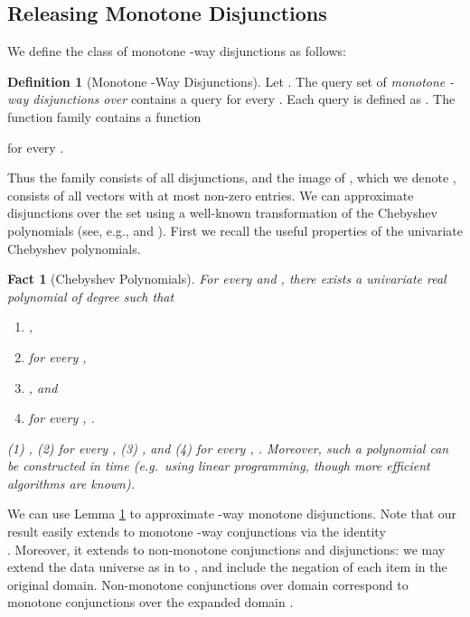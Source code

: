 \documentclass[11pt]{article}
\newtheorem{fact}[theorem]{Fact}
\theoremstyle{definition}
\newtheorem{definition}[theorem]{Definition}
\begin{document}
\subsection{Releasing Monotone Disjunctions} \label{sec:monotonedisj}

We define the class of monotone -way disjunctions as follows:

\begin{definition}[Monotone -Way Disjunctions] \label{def:monotonedisj}Let .
The query set  of \emph{monotone -way disjunctions over } contains a query  for every .  Each query is defined as .
The  function family  contains a function

for every .
\end{definition}

\ifnum{}
Thus the family  consists of all disjunctions, and the image of , which we denote , consists of all vectors  with at most  non-zero entries.  We can approximate disjunctions over the set  using a well-known transformation of the Chebyshev polynomials (see, e.g., \cite[Theorem 8]{KlivansSe04} and \cite[Claim 5.4]{HardtRoSe12}).  First we recall the useful properties of the univariate Chebyshev polynomials.

\begin{fact} [Chebyshev Polynomials] \label{lemma:chebyshev}
For every  and , there exists a univariate real polynomial  of degree  such that 
\ifnum{}
\begin{enumerate}
\item ,
\item for every ,
\item , and
\item for every , .
\end{enumerate}
\else
(1) , (2) for every , (3) , and (4) for every , .
\fi
Moreover, such a polynomial can be constructed in time  (e.g.~using linear programming, though more efficient algorithms are known).
\end{fact}

We can use Lemma \ref{lemma:chebyshev} to approximate -way monotone disjunctions. Note that our result easily extends to monotone -way conjunctions via the identity \\ . 
Moreover, it extends to non-monotone conjunctions and disjunctions: we may extend the data universe
as in \cite[Theorem 1.2]{HardtRoSe12} to , and include the negation of each item in the original domain. Non-monotone conjunctions over domain  correspond to monotone conjunctions over the expanded domain .
\end{document}
